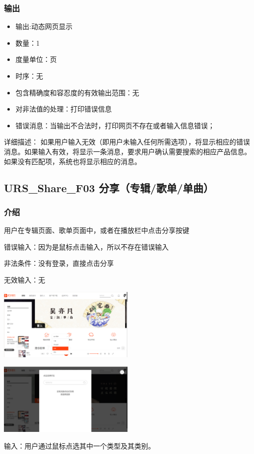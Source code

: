\subsubsection{输出}
\begin{itemize}
	\item	输出:动态网页显示
	\item	数量：1
	\item	度量单位：页
	\item	时序：无
	\item	包含精确度和容忍度的有效输出范围：无
	\item	对非法值的处理：打印错误信息
	\item	错误消息：当输出不合法时，打印网页不存在或者输入信息错误；
   \end{itemize}
   详细描述：
   如果用户输入无效（即用户未输入任何所需选项），将显示相应的错误消息。如果输入有效，将显示一条消息，要求用户确认需要搜索的相应产品信息。如果没有匹配项，系统也将显示相应的消息。
  
 
   \subsection{URS\_Share\_F03 分享（专辑/歌单/单曲）}

   \subsubsection{介绍}
   
   用户在专辑页面、歌单页面中，或者在播放栏中点击分享按键
   
   错误输入：因为是鼠标点击输入，所以不存在错误输入
   
   非法条件：没有登录，直接点击分享
   
   无效输入：无
   \begin{center} 
	\includegraphics[width=0.5\textwidth]{./figures/capture5.png} 

	\end{center}
	\begin{center} 
		\includegraphics[width=0.5\textwidth]{./figures/capture6.png} 
	
		\end{center}
   输入：用户通过鼠标点选其中一个类型及其类别。
   

